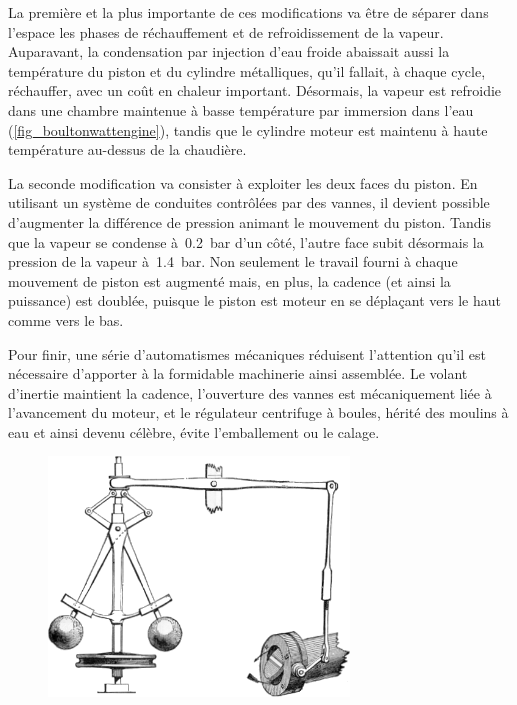 	La première et la plus importante de ces modifications va être de séparer dans l’espace les phases de réchauffement et de refroidissement de la vapeur. Auparavant, la condensation par injection d’eau froide abaissait aussi la température du piston et du cylindre métalliques, qu’il fallait, à chaque cycle, réchauffer, avec un coût en chaleur important. Désormais, la vapeur est refroidie dans une chambre maintenue à basse température par immersion dans l’eau (\cref{fig_boultonwattengine}), tandis que le cylindre moteur est maintenu à haute température au-dessus de la chaudière.

	La seconde modification va consister à exploiter les deux faces du piston. En utilisant un système de conduites contrôlées par des vannes, il devient possible d’augmenter la différence de pression animant le mouvement du piston. Tandis que la vapeur se condense à~\SI{0,2}{\bar} d’un côté, l’autre face subit désormais la pression de la vapeur à~\SI{1,4}{\bar}. Non seulement le travail fourni à chaque mouvement de piston est augmenté mais, en plus, la cadence (et ainsi la puissance) est doublée, puisque le piston est moteur en se déplaçant vers le haut comme vers le bas.

	Pour finir, une série d’automatismes mécaniques réduisent l’attention qu’il est nécessaire d’apporter à la formidable machinerie ainsi assemblée. Le volant d’inertie maintient la cadence, l’ouverture des vannes est mécaniquement liée à l’avancement du moteur, et le régulateur centrifuge à boules, hérité des moulins à eau et ainsi devenu célèbre, évite l’emballement ou le calage.

	\begin{figure}
	\begin{center}
		\includegraphics[width=8cm]{images/centrifugal_governor.png}
	\end{center}
	\end{figure}


